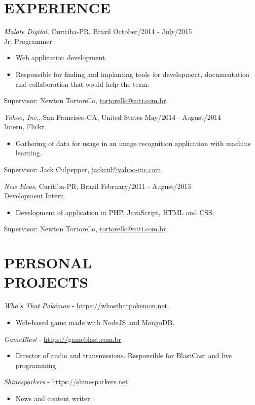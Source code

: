 \documentclass[margin]{res}
\begin{document}
\begin{resume}
 		\section{EXPERIENCE}
			{\sl Malote Digital}, Curitiba-PR, Brazil \hfill October/2014 - July/2015 \\
			Jr. Programmer
			\begin{itemize}
				\itemsep -2pt
		    	\item Web application development.
				\item Responsible for finding and implanting tools for development, documentation and collaboration that would help the team.
			\end{itemize}
			Supervisor: Newton Tortorello, \href{mailto:tortorello@niti.com.br}{tortorello@niti.com.br}.
			
			{\sl Yahoo, Inc.}, San Francisco-CA, United States \hfill May/2014 - August/2014 \\
			Intern, Flickr.
			\begin{itemize}
				\itemsep -2pt
		    	\item Gathering of data for usage in an image recognition application with machine learning.
			\end{itemize}
			Supervisor: Jack Culpepper, \href{mailto:jackcul@yahoo-inc.com}{jackcul@yahoo-inc.com}.

			{\sl New Ideas}, Curitiba-PR, Brazil \hfill February/2011 - August/2013 \\
			Development Intern.
			\begin{itemize}
				\itemsep -2pt
		    	\item Development of application in PHP, JavaScript, HTML and CSS.
			\end{itemize}
			Supervisor: Newton Tortorello, \href{mailto:tortorello@niti.com.br}{tortorello@niti.com.br}.
			
		\section{PERSONAL \\ PROJECTS}
			{\sl Who's That Pokémon} - \href{https://whosthatpokemon.net}{https://whosthatpokemon.net}.
			\begin{itemize}
				\item[] Web-based game made with NodeJS and MongoDB.
			\end{itemize}
			{\sl GameBlast} - \href{https://gameblast.com.br}{https://gameblast.com.br}.
			\begin{itemize}
				\item[] Director of audio and transmissions. Responsible for BlastCast and live programming.
			\end{itemize}
			{\sl Shinesparkers} - \href{https://shinesparkers.net}{https://shinesparkers.net}.
			\begin{itemize}
				\item[] News and content writer.
			\end{itemize}
	

\end{resume}
\end{document}
